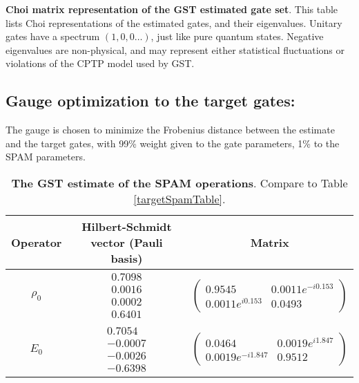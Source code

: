 {\begin{table}[h]
\begin{center}
\caption{\textbf{Choi matrix representation of the GST estimated gate set}.  This table lists Choi representations of the estimated gates, and their eigenvalues.  Unitary gates have a spectrum $(1,0,0\ldots)$, just like pure quantum states.  Negative eigenvalues are non-physical, and may represent either statistical fluctuations or violations of the CPTP model used by GST.\label{bestTargetSpamGatesetChoiTable}}
\end{center}
\end{table}

\clearpage

\subsection{Gauge optimization to the target gates:}
The gauge is chosen to minimize the Frobenius distance between the estimate and the target gates, with 99\% weight given to the gate parameters, 1\% to the SPAM parameters.


\begin{table}[h]
\begin{center}
\begin{tabular}[l]{|c|c|c|}
\hline
Operator & Hilbert-Schmidt vector (Pauli basis) & Matrix \\ \hline
$\rho_{0}$ & $ \begin{array}{c}
0.7098 \\ 
0.0016 \\ 
0.0002 \\ 
0.6401
 \end{array} $
 & $ \left(\!\!\begin{array}{cc}
0.9545 & 0.0011e^{-i0.153} \\ 
0.0011e^{i0.153} & 0.0493
 \end{array}\!\!\right) $
 \\ \hline
$E_{0}$ & $ \begin{array}{c}
0.7054 \\ 
-0.0007 \\ 
-0.0026 \\ 
-0.6398
 \end{array} $
 & $ \left(\!\!\begin{array}{cc}
0.0464 & 0.0019e^{i1.847} \\ 
0.0019e^{-i1.847} & 0.9512
 \end{array}\!\!\right) $
 \\ \hline
\end{tabular}

\caption{\textbf{The GST estimate of the SPAM operations}.  Compare to Table \ref{targetSpamTable}.\label{bestTargetGatesGatesetSpamTable}}
\end{center}
\end{table}

}
